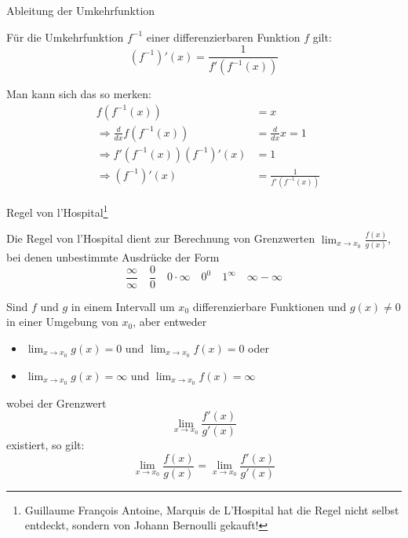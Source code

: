 \begin{frame}{Ableitung der Umkehrfunktion}
	\begin{theorem}
		Für die Umkehrfunktion $f^{-1}$ einer differenzierbaren Funktion $f$ gilt:
		\[
			\left(f^{-1}\right)' (x) = \frac{1}{f'(f^{-1}(x))}
		\]
	\end{theorem}
{\small	\begin{bemerkung}
		Man kann sich das so merken:
		\begin{align*}
		& f\left(f^{-1}(x)\right) & = x \\ & \Rightarrow \frac{d}{dx} f\left(f^{-1}(x)\right) & = \frac{d}{dx} x = 1 \\  & \Rightarrow f'\left( f^{-1}(x) \right)  \left( f^{-1} \right)'(x) & = 1 \\ 
		& \Rightarrow \left( f^{-1} \right)'(x) & = \frac{1}{f'(f^{-1}(x))}
		\end{align*}
	\end{bemerkung}}
\end{frame}

\begin{frame}{Regel von l'Hospital\footnote{Guillaume François Antoine, Marquis de L’Hospital hat die Regel nicht selbst entdeckt, sondern von Johann Bernoulli gekauft!}}

{\footnotesize	\begin{bemerkung}
		Die Regel von l'Hospital dient zur Berechnung von Grenzwerten $\lim_{x \to x_{0}}\frac{f(x)}{g(x)}$, bei denen unbestimmte Ausdrücke der Form
		\[
		\frac{\infty}{\infty} \quad \frac{0}{0} \quad 0\cdot \infty \quad 0^{0} \quad 1^{\infty} \quad \infty - \infty
		\]
	\end{bemerkung}
	\begin{theorem}
		Sind $f$ und $g$ in einem Intervall um $x_{0}$ differenzierbare Funktionen und $g(x)\neq 0$ in einer Umgebung von $x_{0}$, aber entweder 
		\begin{itemize}
			\item 
		$\lim_{x \to x_{0}} g(x) = 0$ und $\lim_{x \to x_{0}} f(x) = 0$ oder
		\item $\lim_{x \to x_{0}} g(x) = \infty$ und $\lim_{x \to x_{0}} f(x) = \infty$
	\end{itemize} 
	wobei der Grenzwert
	\[
		\lim_{x \to x_{0}} \frac{f'(x)}{g'(x)}
	\]
	existiert, so gilt:
	\[
		\lim_{x \to x_{0}} \frac{f(x)}{g(x)} = \lim_{x \to x_{0}} \frac{f'(x)}{g'(x)}
	\]
	\end{theorem}}
\end{frame}

